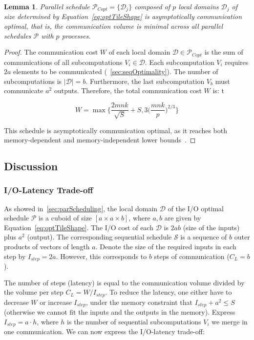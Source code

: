 \documentclass[sigplan,review,anonymous]{acmart}\settopmatter{printfolios=true,printccs=false,printacmref=false}
\newtheorem{lma}{Lemma}
\begin{document}
\begin{lma}
  \label{lma:parSchedule}
  Parallel schedule $\mathcal{P}_{Copt} = \{\mathcal{D}_j\}$ composed of $p$ 
  local domains $\mathcal{D}_j$ of size 
  determined by Equation~\ref{eq:optTileShape} is asymptotically 
  communication optimal, that is, the communication volume is minimal across 
  all parallel schedules $\mathcal{P}$ with $p$ processes.
\end{lma}

\begin{proof}
The communication cost $W$ of each local domain $\mathcal{D} \in 
\mathcal{P}_{Copt}$ is the sum of communications of all subcomputations $V_i 
\in \mathcal{D}$. Each subcomputation $V_i$ requires $2a$ elements to be 
communicated (~\cref{sec:seqOptimality}). The number of subcomputations is 
$|\mathcal{D}| = b$. Furthermore, the last subcomputation $V_b$ must 
communicate $a^2$ outputs. Therefore, the total communication cost $W$ 
is: 
t%


$$W = \max\Big\{\frac{2mnk}{\sqrt{S}} + 
S, 3\Big(\frac{mnk}{p}\Big)^{2/3}  \Big\}$$

This schedule is asymptotically communication optimal, as it reaches both 
memory-dependent and 
memory-independent lower bounds~\cite{memIndependentBound}.
\end{proof}

\subsection{Discussion}

\subsubsection{I/O-Latency Trade-off}
As showed in~\cref{sec:parScheduling}, the local domain $\mathcal{D}$ of the 
I/O optimal 
schedule $\mathcal{P}$ is a cuboid of size $[a \times a \times b]$, where $a, 
b$ are given by Equation~\ref{eq:optTileShape}. The I/O cost of each  
$\mathcal{D}$ is $2ab$ (size of the inputs) plus $a^2$ (output). 
 The corresponding sequential 
schedule $\mathcal{S}$ is a sequence of $b$ outer products of vectors of length 
$a$. Denote the size of the required inputs in each step by $I_{step} = 2a$. 
However, this corresponds to $b$ steps of communication ($C_L = b$).

The number of steps (latency) is equal to the communication volume divided by 
the volume per step $C_L = W/I_{step}$. To reduce the latency, one 
either have to decrease $W$ or increase $I_{step}$, under the memory 
constraint that $I_{step} + a^2 \le S$ (otherwise we cannot fit the inputs and 
the outputs in the memory). Express $I_{step} = a \cdot h$, where $h$ is the 
number of sequential subcomputations $V_i$ we merge in one communication. We 
can now express the I/O-latency trade-off:
\end{document}
